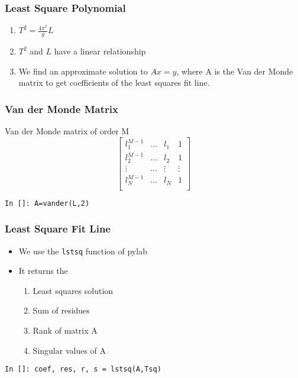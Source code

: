 \documentclass[14pt,compress]{beamer}
\newcommand{\typ}[1]{\lstinline{#1}}
\begin{document}
\begin{frame}[fragile]
\frametitle{Least Square Polynomial}
\begin{enumerate}
\item $T^2 = \frac{4\pi^2}{g}L$
\item $T^2$ and $L$ have a linear relationship
\item We find an approximate solution to $Ax = y$, where A is the Van der Monde matrix to get coefficients of the least squares fit line. 
\end{enumerate}
\end{frame}

\begin{frame}[fragile]
\frametitle{Van der Monde Matrix}
Van der Monde matrix of order M
\begin{equation*}
  \begin{bmatrix}
  l_1^{M-1} & \ldots & l_1 & 1 \\
  l_2^{M-1} & \ldots &l_2 & 1 \\
  \vdots & \ldots & \vdots & \vdots\\
  l_N^{M-1} & \ldots & l_N & 1 \\
  \end{bmatrix}
\end{equation*}
\begin{lstlisting}
In []: A=vander(L,2)
\end{lstlisting}
\end{frame}

\begin{frame}[fragile]
\frametitle{Least Square Fit Line}
\begin{itemize}
\item We use the \typ{lstsq} function of pylab
\item It returns the 
\begin{enumerate}
\item Least squares solution
\item Sum of residues
\item Rank of matrix A
\item Singular values of A
\end{enumerate}
\end{itemize}
\begin{lstlisting}
In []: coef, res, r, s = lstsq(A,Tsq)
\end{lstlisting}
\end{frame}
\end{document}
